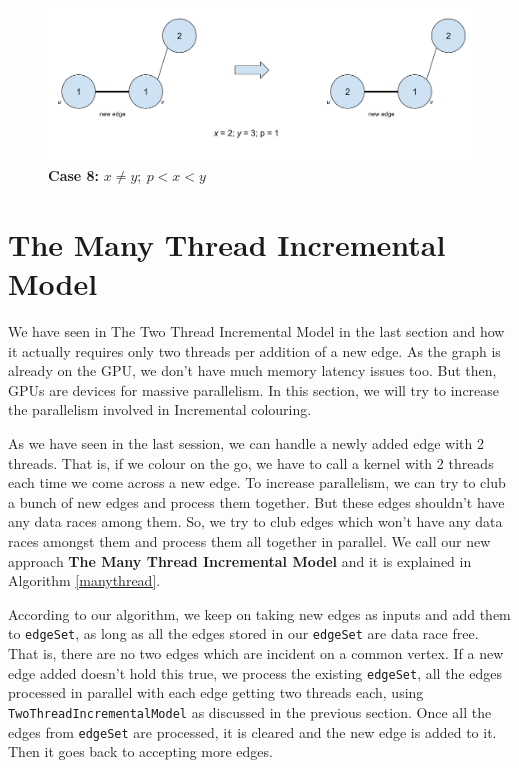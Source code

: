 \documentclass[MTech]{iitmdiss}
\begin{document}
\begin{figure}[h]
    \centering
    \includegraphics[width=\textwidth,keepaspectratio=true]{case8.jpg}
    \caption{
        \textbf{Case 8:} $x \neq y; \: p < x < y$ 
    }
    \label{fig:case8}
\end{figure}

\section{The Many Thread Incremental Model}
We have seen in The Two Thread Incremental Model in the last section and how it actually requires only two threads per addition of a new edge. As the graph is already on the GPU, we don't have much memory latency issues too. But then, GPUs are devices for massive parallelism. In this section, we will try to increase the parallelism involved in Incremental colouring.

As we have seen in the last session, we can handle a newly added edge with 2 threads. That is, if we colour on the go, we have to call a kernel with 2 threads each time we come across a new edge. To increase parallelism, we can try to club a bunch of new edges and process them together. But these edges shouldn't have any data races among them. So, we try to club edges which won't have any data races amongst them and process them all together in parallel. We call our new approach \textbf{The Many Thread Incremental Model} and it is explained in Algorithm \ref{manythread}.

According to our algorithm, we keep on taking new edges as inputs and add them to \verb+edgeSet+, as long as all the edges stored in our \verb+edgeSet+ are data race free. That is, there are no two edges which are incident on a common vertex. If a new edge added doesn't hold this true, we process the existing \verb+edgeSet+, all the edges processed in parallel with each edge getting two threads each, using \verb+TwoThreadIncrementalModel+ as discussed in the previous section. Once all the edges from \verb+edgeSet+ are processed, it is cleared and the new edge is added to it. Then it goes back to accepting more edges. 
\end{document}
